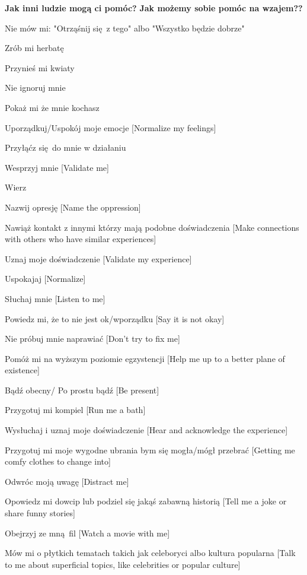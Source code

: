 \noindent\textcolor{ProcessBlue}{\textbf{\Large{Jak inni ludzie mogą ci pomóc?}}}
\noindent\textcolor{ProcessBlue}{\textbf{\Large{Jak możemy sobie pomóc na wzajem??}}}\\
\begin{multicols}{2}
\begin{checkboxlist}
\item Nie mów mi: "Otrząśnij się z tego" albo "Wszystko będzie dobrze"
\item Zrób mi herbatę
\item Przynieś mi kwiaty
\item Nie ignoruj mnie
\item Pokaż mi że mnie kochasz
\item Uporządkuj/Uspokój moje emocje [Normalize my feelings]
\item Przyłąćz się do mnie w działaniu
\item Wesprzyj mnie [Validate me]
\item Wierz
\item Nazwij opresję [Name the oppression]
\item Nawiąż kontakt z innymi którzy mają podobne doświadczenia [Make connections with others who have similar experiences]
\item Uznaj moje doświadczenie [Validate my experience]
\item Uspokajaj [Normalize]
\item Słuchaj mnie [Listen to me]
\item Powiedz mi, że to nie jest ok/wporządku [Say it is not okay]
\item Nie próbuj mnie naprawiać [Don’t try to fix me]
\item Pomóż mi na wyższym poziomie egzystencji [Help me up to a better plane of existence]
\item Bądź obecny/ Po prostu bądź [Be present]
\item Przygotuj mi kompiel [Run me a bath]
\item Wysłuchaj i uznaj moje doświadczenie [Hear and acknowledge the experience]
\item Przygotuj mi moje wygodne ubrania bym się mogła/mógł przebrać [Getting me comfy clothes to change into]
\item Odwróc moją uwagę [Distract me]
\item Opowiedz mi dowcip lub podziel się jakąś zabawną historią [Tell me a joke or share funny stories]
\item Obejrzyj ze mną fil [Watch a movie with me]
\item Mów mi o płytkich tematach takich jak celeboryci albo kultura popularna [Talk to me about superficial topics, like celebrities or popular culture]

\end{checkboxlist}
\end{multicols}
